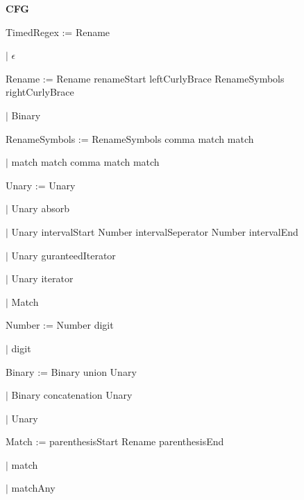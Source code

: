 
\textbf{CFG}

TimedRegex := Rename

\qquad	$\mid$ $\epsilon$

Rename := Rename renameStart leftCurlyBrace RenameSymbols rightCurlyBrace

\qquad $\mid$ Binary

RenameSymbols := RenameSymbols comma match match

\qquad $\mid$ match match comma match match

Unary := Unary

\qquad $\mid$ Unary absorb

\qquad $\mid$ Unary intervalStart Number intervalSeperator Number intervalEnd

\qquad $\mid$ Unary guranteedIterator

\qquad $\mid$ Unary iterator

\qquad $\mid$ Match

Number := Number digit

\qquad $\mid$ digit

Binary := Binary union Unary

\qquad $\mid$ Binary concatenation Unary

\qquad $\mid$ Unary

Match := parenthesisStart Rename parenthesisEnd

\qquad $\mid$ match

\qquad $\mid$ matchAny

